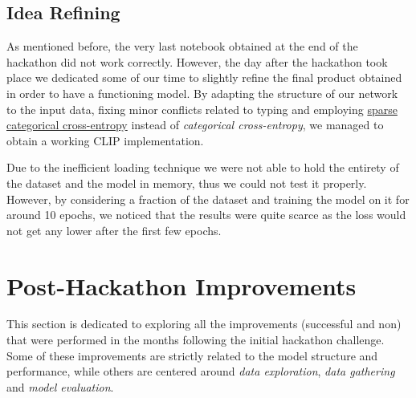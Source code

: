 \documentclass[10pt,twocolumn,letterpaper]{article}
\begin{document}
\subsection{Idea Refining}


As mentioned before, the very last notebook obtained at the end of the hackathon did not work correctly.
However, the day after the hackathon took place we dedicated some of our time to slightly refine the final product obtained in order to have a functioning model.
By adapting the structure of our network to the input data, fixing minor conflicts related to typing and employing \href{https://www.tensorflow.org/api_docs/python/tf/keras/losses/SparseCategoricalCrossentropy}{sparse categorical cross-entropy} instead of \textit{categorical cross-entropy}, we managed to obtain a working CLIP implementation.

Due to the inefficient loading technique we were not able to hold the entirety of the dataset and the model in memory, thus we could not test it properly.
However, by considering a fraction of the dataset and training the model on it for around 10 epochs, we noticed that the results were quite scarce as the loss would not get any lower after the first few epochs.



\section{Post-Hackathon Improvements}
This section is dedicated to exploring all the improvements (successful and non) that were performed in the months following the initial hackathon challenge.
Some of these improvements are strictly related to the model structure and performance, while others are centered around \textit{data exploration}, \textit{data gathering} and \textit{model evaluation}.
\end{document}
